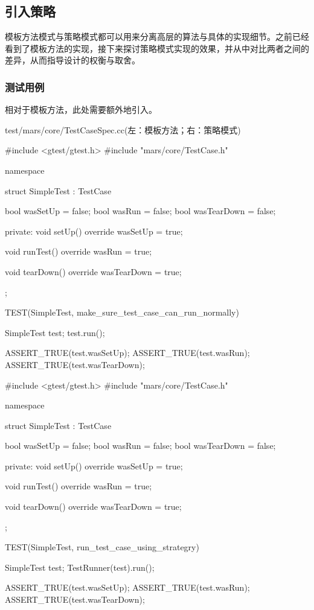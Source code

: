 \begin{content}
\subsection{引入策略}

模板方法模式与策略模式都可以用来分离高层的算法与具体的实现细节。之前已经看到了模板方法的实现，接下来探讨策略模式实现的效果，并从中对比两者之间的差异，从而指导设计的权衡与取舍。

\subsubsection{测试用例}

相对于模板方法，此处需要额外地引入。

\begin{diff}{test/mars/core/TestCaseSpec.cc(左：模板方法；右：策略模式)}
 \begin{minicpp}
#include <gtest/gtest.h>
#include "mars/core/TestCase.h"

namespace {
  struct SimpleTest : TestCase {
    bool wasSetUp = false;
    bool wasRun = false;
    bool wasTearDown = false;

  private:
    void setUp() override {
      wasSetUp = true;
    }

    void runTest() override {
      wasRun = true;
    }

    void tearDown() override {
      wasTearDown = true;
    }
  };
}

TEST(SimpleTest, make_sure_test_case_can_run_normally) {
  SimpleTest test;
  test.run();

  ASSERT_TRUE(test.wasSetUp);
  ASSERT_TRUE(test.wasRun);
  ASSERT_TRUE(test.wasTearDown);  
} \end{minicpp}
\tcblower
 \begin{minicpp}
#include <gtest/gtest.h>
#include "mars/core/TestCase.h"

namespace {
  struct SimpleTest : TestCase {
    bool wasSetUp = false;
    bool wasRun = false;
    bool wasTearDown = false;

  private:
    void setUp() override {
      wasSetUp = true;
    }

    void runTest() override {
      wasRun = true;
    }

    void tearDown() override {
      wasTearDown = true;
    }
  };
}

TEST(SimpleTest, run_test_case_using_strategry) {
  SimpleTest test;
  TestRunner(test).run();

  ASSERT_TRUE(test.wasSetUp);
  ASSERT_TRUE(test.wasRun);
  ASSERT_TRUE(test.wasTearDown);  
}
 \end{minicpp} 
\end{diff}


\end{content}
